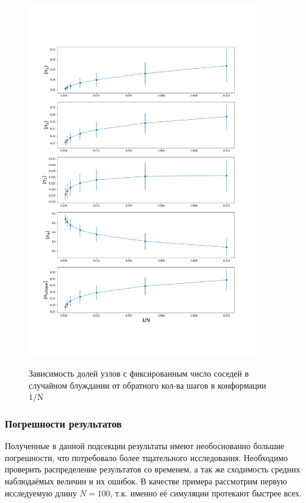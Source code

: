 \begin{figure}[]
    \centering
    \caption{Зависимость долей узлов с фиксированным число соседей в случайном блуждании от обратного кол-ва шагов в конформации 1/N}
    \includegraphics[width=0.9\textwidth]{Sections/Images/Rand_Path_N1-4_unique.png}
    \label{fig:Rand_Path_N1_4}
\end{figure}

\newpage

\subsubsection{Погрешности результатов}

Полученные в данной подсекции результаты имеют необоснованно большие погрешности, что потребовало более тщательного исследования. Необходимо проверить распределение результатов со временем, а так же сходимость средних наблюдаёмых величин и их ошибок. В качестве примера рассмотрим первую исследуемую длину $N=100$, т.к. именно её симуляции протекают быстрее всех.  

